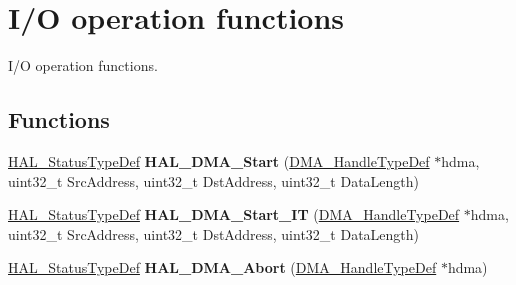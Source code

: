 \hypertarget{group___d_m_a___exported___functions___group2}{}\section{I/O operation functions}
\label{group___d_m_a___exported___functions___group2}


I/O operation functions.  


\subsection*{Functions}
\begin{DoxyCompactItemize}
\item 
\mbox{\label{group___d_m_a___exported___functions___group2_ga96fbd9c285135f558fd9283a57406330}} 
\mbox{\hyperlink{stm32f7xx__hal__def_8h_a63c0679d1cb8b8c684fbb0632743478f}{H\+A\+L\+\_\+\+Status\+Type\+Def}} {\bfseries H\+A\+L\+\_\+\+D\+M\+A\+\_\+\+Start} (\mbox{\hyperlink{group___d_m_a___exported___types_ga41b754a906b86bce54dc79938970138b}{D\+M\+A\+\_\+\+Handle\+Type\+Def}} $\ast$hdma, uint32\+\_\+t Src\+Address, uint32\+\_\+t Dst\+Address, uint32\+\_\+t Data\+Length)
\item 
\mbox{\label{group___d_m_a___exported___functions___group2_ga7eddc0931ac8a3d77b23d6d5e68407c7}} 
\mbox{\hyperlink{stm32f7xx__hal__def_8h_a63c0679d1cb8b8c684fbb0632743478f}{H\+A\+L\+\_\+\+Status\+Type\+Def}} {\bfseries H\+A\+L\+\_\+\+D\+M\+A\+\_\+\+Start\+\_\+\+IT} (\mbox{\hyperlink{group___d_m_a___exported___types_ga41b754a906b86bce54dc79938970138b}{D\+M\+A\+\_\+\+Handle\+Type\+Def}} $\ast$hdma, uint32\+\_\+t Src\+Address, uint32\+\_\+t Dst\+Address, uint32\+\_\+t Data\+Length)
\item 
\mbox{\label{group___d_m_a___exported___functions___group2_ga001f9fb04328a7460f9ff16908ff987c}} 
\mbox{\hyperlink{stm32f7xx__hal__def_8h_a63c0679d1cb8b8c684fbb0632743478f}{H\+A\+L\+\_\+\+Status\+Type\+Def}} {\bfseries H\+A\+L\+\_\+\+D\+M\+A\+\_\+\+Abort} (\mbox{\hyperlink{group___d_m_a___exported___types_ga41b754a906b86bce54dc79938970138b}{D\+M\+A\+\_\+\+Handle\+Type\+Def}} $\ast$hdma)
\item 
\mbox{\label{group___d_m_a___exported___functions___group2_ga6677d7e614747341a58ffd7a048fd390}} 

\end{DoxyCompactItemize}
